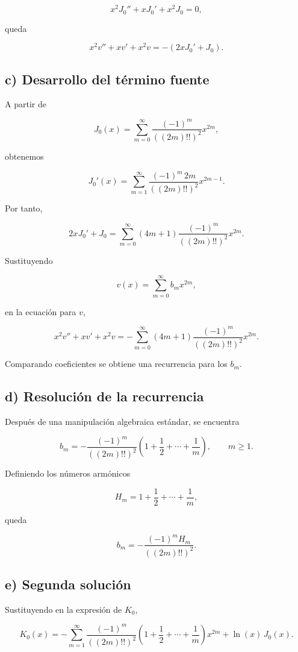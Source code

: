 \documentclass[11pt,spanish]{article}
\begin{document}
\[
x^2J_0''+xJ_0'+x^2J_0=0,
\]

queda

\[
x^2v''+xv'+x^2v
=
-\left(2xJ_0'+J_0\right).
\]

\subsection*{c) Desarrollo del término fuente}

A partir de

\[
J_0(x)
=
\sum_{m=0}^{\infty}
\frac{(-1)^m}{((2m)!!)^2}
x^{2m},
\]

obtenemos

\[
J_0'(x)
=
\sum_{m=1}^{\infty}
\frac{(-1)^m\,2m}
     {((2m)!!)^2}
x^{2m-1}.
\]

Por tanto,

\[
2xJ_0'+J_0
=
\sum_{m=0}^{\infty}
(4m+1)
\frac{(-1)^m}
     {((2m)!!)^2}
x^{2m}.
\]

Sustituyendo

\[
v(x)=\sum_{m=0}^{\infty}b_mx^{2m},
\]

en la ecuación para \(v\),

\[
x^2v''+xv'+x^2v
=
-\sum_{m=0}^{\infty}
(4m+1)
\frac{(-1)^m}
     {((2m)!!)^2}
x^{2m}.
\]

Comparando coeficientes se obtiene una recurrencia para los \(b_m\).

\subsection*{d) Resolución de la recurrencia}

Después de una manipulación algebraica estándar, se encuentra

\[
b_m
=
-\frac{(-1)^m}{((2m)!!)^2}
\left(
1+\frac12+\cdots+\frac1m
\right),
\qquad m\ge 1.
\]

Definiendo los números armónicos

\[
H_m
=
1+\frac12+\cdots+\frac1m,
\]

queda

\[
b_m
=
-\frac{(-1)^mH_m}
       {((2m)!!)^2}.
\]

\subsection*{e) Segunda solución}

Sustituyendo en la expresión de \(K_0\),

\[
\boxed{
K_0(x)
=
-\sum_{m=1}^{\infty}
\frac{(-1)^m}
     {((2m)!!)^2}
\left(
1+\frac12+\cdots+\frac1m
\right)
x^{2m}
+
\ln(x)\,J_0(x).
}
\]
\end{document}
